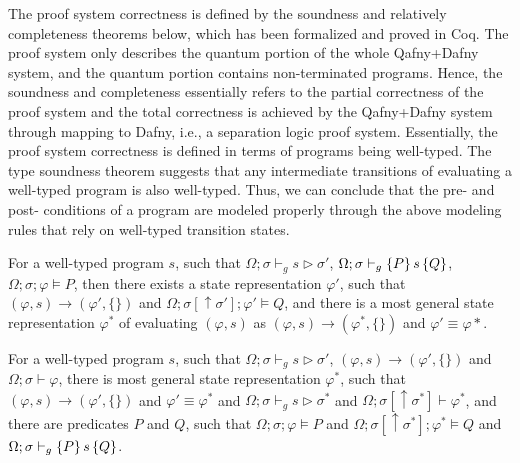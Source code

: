 The \qafny proof system correctness is defined by the soundness and relatively completeness theorems below, which has been formalized and proved in Coq. The \qafny proof system only describes the quantum portion of the whole Qafny+Dafny system, and the quantum portion contains non-terminated programs. Hence, the soundness and completeness essentially refers to the partial correctness of the \qafny proof system and the total correctness is achieved by the Qafny+Dafny system through mapping \qafny to Dafny, i.e., a separation logic proof system. Essentially, the \qafny proof system correctness is defined in terms of programs being well-typed. The type soundness theorem suggests that any intermediate transitions of evaluating a well-typed \qafny program is also well-typed. Thus, we can conclude that the pre- and post- conditions of a program are modeled properly through the above modeling rules that rely on well-typed transition states.

\begin{theorem}\label{thm:proof-soundness}\rm 
For a well-typed program $s$, such that $\Omega;\sigma\vdash_g s \triangleright \sigma'$, $\Omega;\sigma\vdash_{g}\{P\}\, s \,\{Q\}$, $\Omega;\sigma;\varphi\models P$, then there exists a state representation $\varphi'$, such that $(\varphi,s)\longrightarrow (\varphi',\{\})$ and $\Omega;\sigma[\uparrow\sigma'];\varphi'\models Q$, and there is a most general state representation $\varphi^*$ of evaluating $(\varphi,s)$ as $(\varphi,s)\longrightarrow (\varphi^*,\{\})$ and $\varphi' \equiv \varphi*$.
\end{theorem}

\begin{theorem}\label{thm:proof-completeness}\rm 
For a well-typed program $s$, such that $\Omega;\sigma\vdash_g s \triangleright \sigma'$, $(\varphi,s)\longrightarrow (\varphi',\{\})$ and $\Omega;\sigma\vdash \varphi$, there is most general state representation $\varphi^*$, such that $(\varphi,s)\longrightarrow (\varphi',\{\})$ and $\varphi' \equiv \varphi^*$ and $\Omega;\sigma\vdash_g s \triangleright \sigma^*$ and $\Omega;\sigma[\uparrow \sigma^*]\vdash \varphi^*$, and there are predicates $P$ and $Q$, such that $\Omega;\sigma;\varphi\models P$ and $\Omega;\sigma[\uparrow\sigma^*];\varphi^* \models Q$ and $\Omega;\sigma\vdash_{g}\{P\}\, s \,\{Q\}$.
\end{theorem}




